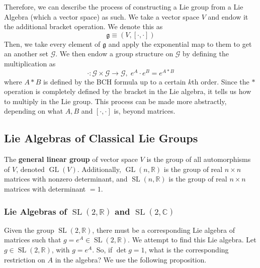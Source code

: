 \documentclass{article}
\DeclareMathOperator{\GL}{GL}
\DeclareMathOperator{\SL}{SL}
\begin{document}
    Therefore, we can describe the process of constructing a Lie group from a Lie Algebra (which a vector space) as such. We take a vector space $V$ and endow it the additional bracket operation. We denote this as
    \begin{equation}
      \mathfrak{g} \equiv (V, [\cdot, \cdot])
    \end{equation}
    Then, we take every element of $\mathfrak{g}$ and apply the exponential map to them to get an another set $\mathcal{G}$. We then endow a group structure on $\mathcal{G}$ by defining the multiplication as 
    \begin{equation}
      \cdot: \mathcal{G} \times \mathcal{G} \longrightarrow \mathcal{G}, \; e^A \cdot e^B = e^{A * B}
    \end{equation}
    where $A*B$ is defined by the BCH formula up to a certain $k$th order. Since the $*$ operation is completely defined by the bracket in the Lie algebra, it tells us how to multiply in the Lie group. This process can be made more abstractly, depending on what $A, B$ and $[\cdot,\cdot]$ is, beyond matrices. 

  \subsection{Lie Algebras of Classical Lie Groups}

    \begin{definition}
      The \textbf{general linear group} of vector space $V$ is the group of all automorphisms of $V$, denoted $\GL(V)$. Additionally, $\GL(n, \mathbb{R})$ is the group of real $n \times n$ matrices with nonzero determinant, and $\SL(n, \mathbb{R})$ is the group of real $n \times n$ matrices with determinant $= 1$.
    \end{definition}

    \subsubsection[Lie Algebras of SL(2, R) and SL(2, C)]{Lie Algebras of $\SL(2, \mathbb{R})$ and $\SL(2, \mathbb{C})$}

      Given the group $\SL(2, \mathbb{R})$, there must be a corresponding Lie algebra of matrices such that $g = e^A \in \SL(2, \mathbb{R})$. We attempt to find this Lie algebra. Let $g \in \SL(2, \mathbb{R})$, with $g = e^A$. So, if $\det{g} = 1$, what is the corresponding restriction on $A$ in the algebra? We use the following proposition. 
\end{document}
